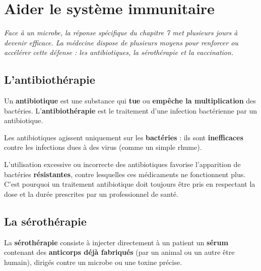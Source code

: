 \chapter{Aider le système immunitaire}

\noindent\textit{Face à un microbe, la réponse spécifique du chapitre 7 met plusieurs
jours à devenir efficace. La médecine dispose de plusieurs moyens pour renforcer ou
accélérer cette défense : les antibiotiques, la sérothérapie et la vaccination.}
\vspace{8pt}

\connecteBanner

\section{L'antibiothérapie}

\begin{definition}[Antibiotique]
Un \textbf{antibiotique} est une substance qui \textbf{tue} ou \textbf{empêche la
multiplication} des bactéries. L'\textbf{antibiothérapie} est le traitement d'une
infection bactérienne par un antibiotique.
\end{definition}

\begin{propriete}
Les antibiotiques agissent uniquement sur les \textbf{bactéries} : ils sont
\textbf{inefficaces} contre les infections dues à des virus (comme un simple rhume).
\end{propriete}

\begin{remarque}
L'utilisation excessive ou incorrecte des antibiotiques favorise l'apparition de
bactéries \textbf{résistantes}, contre lesquelles ces médicaments ne fonctionnent
plus. C'est pourquoi un traitement antibiotique doit toujours être pris en respectant
la dose et la durée prescrites par un professionnel de santé.
\end{remarque}

\section{La sérothérapie}

\begin{definition}[Sérothérapie]
La \textbf{sérothérapie} consiste à injecter directement à un patient un
\textbf{sérum} contenant des \textbf{anticorps déjà fabriqués} (par un animal ou un
autre être humain), dirigés contre un microbe ou une toxine précise.
\end{definition}

